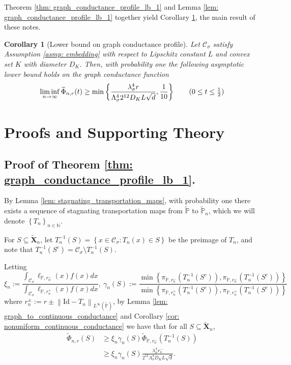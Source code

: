 \documentclass{article}
\newcommand{\norm}[1]{\left\lVert#1\right\rVert}
\newcommand{\set}[1]{\left\{#1\right\}}
\newcommand{\seq}[1]{\set{#1}_{n \in \N}}
\newcommand{\N}{\mathbb{N}}
\newcommand{\Xbf}{\mathbf{X}}
\newcommand{\Cset}{\mathcal{C}}
\newcommand{\Csig}{\Cset_{\sigma}}
\newcommand{\Pbb}{\mathbb{P}}
\newcommand{\1}{\mathbf{1}}
\theoremstyle{alden}
\theoremstyle{aldenthm}
\newtheorem{corollary}{Corollary}
\theoremstyle{remark}
\begin{document}
Theorem \ref{thm: graph_conductance_profile_lb_1} and Lemma \ref{lem: graph_conductance_profile_lb_1} together yield Corollary \ref{cor: graph_conductance_profile_lb}, the main result of these notes.

\begin{corollary}[Lower bound on graph conductance profile]
	\label{cor: graph_conductance_profile_lb}
	Let $\Csig$ satisfy Assumption \ref{asmp: embedding} with respect to Lipschitz constant $L$ and convex set $K$ with diameter $D_K$. Then, with probability one the following asymptotic lower bound holds on the graph conductance function
	\begin{equation*}
	\liminf_{n \to \infty} \widetilde{\Phi}_{n,r}(t) \geq \min\set{\frac{\lambda_{\sigma}^4 r}{\Lambda_{\sigma}^4 2^{12} D_K L \sqrt{d}}, \frac{1}{10}} \tag{$0 \leq t \leq \frac{1}{2}$}
	\end{equation*}
\end{corollary}



\section{Proofs and Supporting Theory}
\label{sec: proof_and_supporting_theory}

\subsection{Proof of Theorem \ref{thm: graph_conductance_profile_lb_1}.}

By Lemma \ref{lem: stagnating_transportation_maps}, with probability one there exists a sequence of stagnating transportation maps from $\widetilde{\Pbb}$ to $\widetilde{\Pbb}_n$, which we will denote $\seq{T_n}$. 

For $S \subseteq \widetilde{\Xbf}_n$, let $T_n^{-1}(S) = \set{x \in \Csig: T_n(x) \in S}$ be the preimage of $T_n$, and note that $T_n^{-1}(S^c) = \Csig \setminus T_n^{-1}(S)$. 

Letting
\begin{equation*}
\xi_n := \frac{\int_{\Csig} \ell_{\Pbb,r_n^-}(x) f(x) dx}{\int_{\Csig} \ell_{\Pbb,r_n^+}(x) f(x) dx},~ \gamma_n(S) := \frac{\min \set{\pi_{\Pbb,r_n^-}(T_n^{-1}(S^c)), \pi_{\Pbb,r_n^-}(T_n^{-1}(S^c))} }{\min \set{\pi_{\Pbb,r_n^+}(T_n^{-1}(S^c)), \pi_{\Pbb,r_n^+}(T_n^{-1}(S^c))} } 
\end{equation*}
where $r_n^{\pm} := r \pm \norm{\mathrm{Id} - T_n}_{L^{\infty}(\widetilde{\Pbb})}$, by Lemma \ref{lem: graph_to_continuous_conductance} and Corollary \ref{cor: nonuniform_continuous_conductance} we have that for all $S \subseteq \widetilde{\Xbf}_n$,
\begin{align}
\widetilde{\Phi}_{n,r}(S) & \geq \xi_n \gamma_n(S) \widetilde{\Phi}_{\Pbb,r_n^{-}}(T_n^{-1}(S)) \nonumber \\
& \geq  \xi_n \gamma_n(S) \frac{\lambda_{\sigma}^4r_n^{-}}{2^{12} \Lambda_{\sigma}^4 D_K L \sqrt{d}}. \label{eqn: graph_ncut_lb_1}
\end{align}
\end{document}
